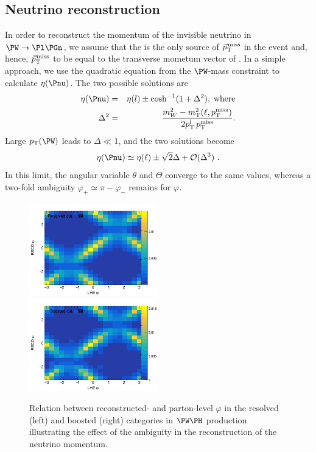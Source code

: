 \documentclass[a4paper,11pt]{article}
\begin{document}
\subsection{Neutrino reconstruction}
\label{sec:neu_reco}

In order to reconstruct the momentum of the invisible neutrino in $\PW\rightarrow\Pl\Pgn$, we assume that the \Pnu is the only source of ${\vec p}_{\mathrm{T}}^{\kern1pt\text{miss}}$ in the event and, hence, ${\vec p}_{\mathrm{T}}^{\kern1pt\text{miss}}$ to be equal to the transverse mometum vector of \Pnu. 
In a simple approach, we use the quadratic equation from the $\PW$-mass constraint to calculate $\eta(\Pnu)$. 
The two possible solutions are
\begin{eqnarray}
\eta(\Pnu) &=& {\eta}(l) \pm \cosh^{-1}(1+{\Delta}^2),\;\textrm{where}\label{Eq:NeuEta}\\
{\Delta}^2 &=& \frac{m_W^2 - m_\textrm{T}^2 (\ell,{p_\textrm{T}^\text{miss}\xspace})}{2 p_\textrm{T}^{l}\, p_\textrm{T}^\textrm{miss}}. 
\end{eqnarray}
Large $\pt(\PW)$ leads to $\Delta \ll 1$, and the two solutions become 
\begin{equation}
{\eta}(\Pnu) \simeq {\eta}(\ell) \pm \sqrt{2}{\Delta} + {\cal{O}} ({\Delta}^3)	\ .
\label{Eq:NeuEta2}
\end{equation}
In this limit,  the angular variable $\theta$ and $\Theta$ converge to the same values, whereas a two-fold ambiguity  $\varphi_{+} \simeq \pi - \varphi_{-}$ remains for $\varphi$. 
\begin{figure}[hbtp]
\begin{center}
\includegraphics[width=0.495\textwidth]{Figures/New/RECO/Resolved_Plot_2D_phi_unweighted.png}
\includegraphics[width=0.495\textwidth]{Figures/New/RECO/Boosted_Plot_2D_phi_unweighted.png}
\end{center}
\caption{
Relation between reconstructed- and parton-level $\varphi$ in the resolved (left) and boosted (right) categories in $\PW\PH$ production illustrating the effect of the ambiguity in the reconstruction of the neutrino momentum. 
}
\label{fig:neureco}
\end{figure}
\end{document}
